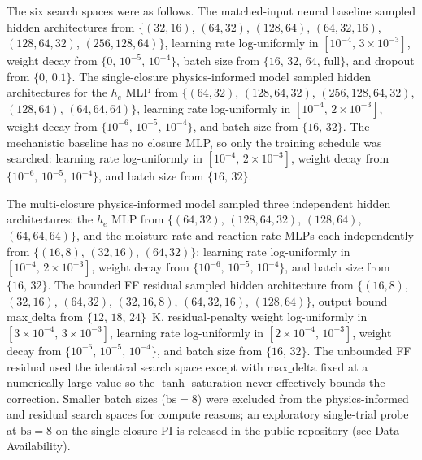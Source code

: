 \documentclass[fleqn,10pt]{wlscirep}
\begin{document}
The six search spaces were as follows. The matched-input neural baseline sampled hidden architectures from $\{$$(32,16)$, $(64,32)$, $(128,64)$, $(64,32,16)$, $(128,64,32)$, $(256,128,64)$$\}$, learning rate log-uniformly in $[10^{-4},\,3\times10^{-3}]$, weight decay from $\{0,\,10^{-5},\,10^{-4}\}$, batch size from $\{16,\,32,\,64,\,\text{full}\}$, and dropout from $\{0,\,0.1\}$. The single-closure physics-informed model sampled hidden architectures for the $h_e$ MLP from $\{$$(64,32)$, $(128,64,32)$, $(256,128,64,32)$, $(128,64)$, $(64,64,64)$$\}$, learning rate log-uniformly in $[10^{-4},\,2\times10^{-3}]$, weight decay from $\{10^{-6},\,10^{-5},\,10^{-4}\}$, and batch size from $\{16,\,32\}$. The mechanistic baseline has no closure MLP, so only the training schedule was searched: learning rate log-uniformly in $[10^{-4},\,2\times10^{-3}]$, weight decay from $\{10^{-6},\,10^{-5},\,10^{-4}\}$, and batch size from $\{16,\,32\}$.

The multi-closure physics-informed model sampled three independent hidden architectures: the $h_e$ MLP from $\{$$(64,32)$, $(128,64,32)$, $(128,64)$, $(64,64,64)$$\}$, and the moisture-rate and reaction-rate MLPs each independently from $\{$$(16,8)$, $(32,16)$, $(64,32)$$\}$; learning rate log-uniformly in $[10^{-4},\,2\times10^{-3}]$, weight decay from $\{10^{-6},\,10^{-5},\,10^{-4}\}$, and batch size from $\{16,\,32\}$. The bounded FF residual sampled hidden architecture from $\{$$(16,8)$, $(32,16)$, $(64,32)$, $(32,16,8)$, $(64,32,16)$, $(128,64)$$\}$, output bound $\mathrm{max\_delta}$ from $\{12,\,18,\,24\}$~K, residual-penalty weight log-uniformly in $[3\times10^{-4},\,3\times10^{-3}]$, learning rate log-uniformly in $[2\times10^{-4},\,10^{-3}]$, weight decay from $\{10^{-6},\,10^{-5},\,10^{-4}\}$, and batch size from $\{16,\,32\}$. The unbounded FF residual used the identical search space except with $\mathrm{max\_delta}$ fixed at a numerically large value so the $\tanh$ saturation never effectively bounds the correction. Smaller batch sizes ($\mathrm{bs}=8$) were excluded from the physics-informed and residual search spaces for compute reasons; an exploratory single-trial probe at $\mathrm{bs}=8$ on the single-closure PI is released in the public repository (see Data Availability).
\end{document}
